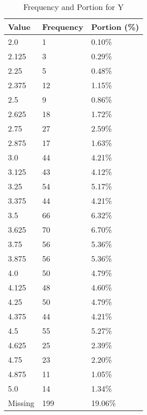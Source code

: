 \begin{table}[H]
\centering
\begin{tabular}{|l|l|l|}
\hline
\textbf{Value} & \textbf{Frequency} & \textbf{Portion (\%)} \\ \hline
2.0 & 1 & 0.10\% \\ \hline
2.125 & 3 & 0.29\% \\ \hline
2.25 & 5 & 0.48\% \\ \hline
2.375 & 12 & 1.15\% \\ \hline
2.5 & 9 & 0.86\% \\ \hline
2.625 & 18 & 1.72\% \\ \hline
2.75 & 27 & 2.59\% \\ \hline
2.875 & 17 & 1.63\% \\ \hline
3.0 & 44 & 4.21\% \\ \hline
3.125 & 43 & 4.12\% \\ \hline
3.25 & 54 & 5.17\% \\ \hline
3.375 & 44 & 4.21\% \\ \hline
3.5 & 66 & 6.32\% \\ \hline
3.625 & 70 & 6.70\% \\ \hline
3.75 & 56 & 5.36\% \\ \hline
3.875 & 56 & 5.36\% \\ \hline
4.0 & 50 & 4.79\% \\ \hline
4.125 & 48 & 4.60\% \\ \hline
4.25 & 50 & 4.79\% \\ \hline
4.375 & 44 & 4.21\% \\ \hline
4.5 & 55 & 5.27\% \\ \hline
4.625 & 25 & 2.39\% \\ \hline
4.75 & 23 & 2.20\% \\ \hline
4.875 & 11 & 1.05\% \\ \hline
5.0 & 14 & 1.34\% \\ \hline
Missing & 199 & 19.06\% \\ \hline
\end{tabular}
\caption{Frequency and Portion for Y}
\end{table}
